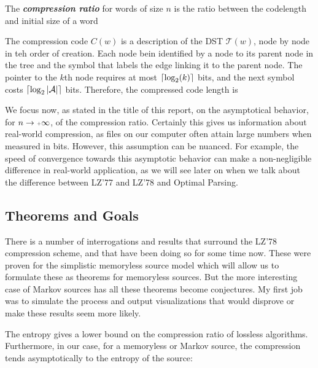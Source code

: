 \begin{df}
    \label{df:compratio}
    The \emph{\bfseries compression ratio} for words of size $n$ is the ratio between the 
    codelength and initial size of a word
\end{df}

\begin{prop}
    The compression code $C(w)$ is a description of the DST $\mathcal{T}(w)$,
    node by node in teh order of creation. Each node bein identified by a node 
    to its parent node in the tree and the symbol that labels the edge linking it to the
    parent node. The pointer to the $k$th node requires at most $\lceil\log_2(k)\rceil$ bits,
    and the next symbol costs $\lceil\log_2 |\mathcal{A}|\rceil$ bits. Therefore, the 
    compressed code length is 
\end{prop}




    \noindent
    We focus now, as stated in the title of this report, on the asymptotical behavior,
    for $n \rightarrow \pinf$, of the compression ratio. Certainly this gives us 
    information about real-world compression, as files on our computer often attain
    large numbers when measured in bits. However, this assumption can be nuanced.
    For example, the speed of convergence towards this asymptotic behavior can make 
    a non-negligible difference in real-world application, as we will see later on
    when we talk about the difference between LZ'77 and LZ'78 and Optimal Parsing.


\subsection{ Theorems and Goals }

    There is a number of interrogations and results that surround
    the LZ'78 compression scheme, and that have been doing so for 
    some time now. These were proven for the simplistic memoryless
    source model which will allow us to formulate these as 
    theorems for memoryless sources. But the more interesting case
    of Markov sources has all these theorems become conjectures.
    My first job was to simulate the process and output visualizations
    that would disprove or make these results seem more likely.

    

    \begin{prop}
        \label{prop:lowerbound}
        The entropy gives a lower bound on the compression 
    ratio of lossless algorithms. Furthermore, in our
    case, for a memoryless or Markov source, the compression
    tends asymptotically to the entropy of the source:
    \end{prop}

